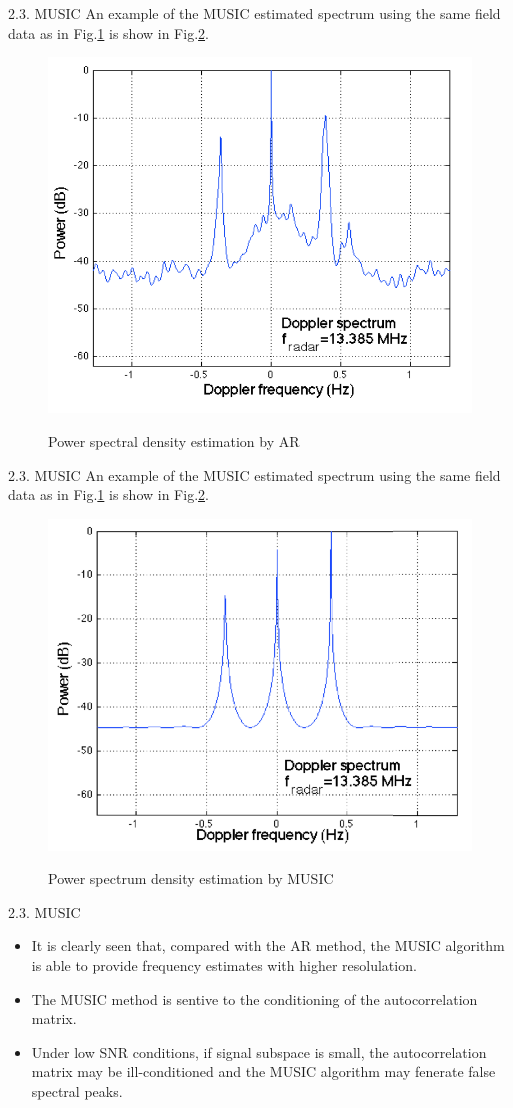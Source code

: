 \documentclass[12pt]{beamer}
\begin{document}
\begin{frame}{2.3. MUSIC}
  An example of the MUSIC estimated spectrum using the same field data as in Fig.\ref{f2} is show in Fig.\ref{f3}.
  \begin{figure}[htbp]
    \centering
    \caption{Power spectral density estimation by AR}
    \includegraphics[width=0.4\linewidth]{./figs/f2.png}
    \label{f2}
  \end{figure}
\end{frame}

\begin{frame}{2.3. MUSIC}
  An example of the MUSIC estimated spectrum using the same field data as in Fig.\ref{f2} is show in Fig.\ref{f3}.
  \begin{figure}[htbp]
    \centering
    \caption{Power spectrum density estimation by MUSIC}
    \includegraphics[width=0.4\linewidth]{./figs/f3.png}
    \label{f3}
  \end{figure}
\end{frame}

\begin{frame}{2.3. MUSIC}
  \begin{itemize}
    \item It is clearly seen that, compared  with the AR method, the MUSIC algorithm is able to provide frequency estimates with higher resolulation.
    \item The MUSIC method is sentive to  the conditioning of the autocorrelation matrix.
    \item Under low SNR conditions, if signal subspace is small, the autocorrelation matrix may be ill-conditioned and the MUSIC algorithm may fenerate false spectral peaks.
  \end{itemize}
   
\end{frame}
\end{document}
